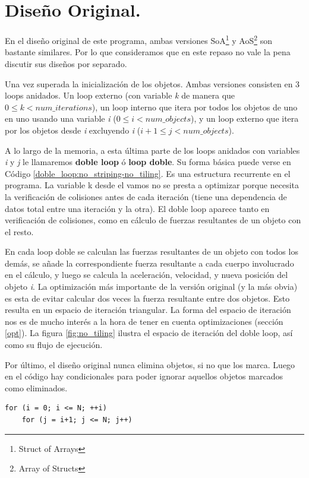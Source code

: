 \documentclass{article}
\begin{document}
\section{Diseño Original.\label{original}}
En el diseño original de este programa, ambas versiones SoA\footnote{Struct of Arrays} y AoS\footnote{Array of Structs}
son bastante similares. Por lo que consideramos que en este repaso no vale la pena discutir sus diseños por separado.


Una vez superada la inicialización de los objetos. Ambas versiones consisten en 3 loops anidados.
Un loop externo (con variable \textit{k} de manera que $0\leq{k} < {num\_iterations}$),
un loop interno que itera por todos los objetos de uno en uno usando una variable \textit{i}
($0\leq{i} < {num\_objects}$), y un loop externo que itera por los objetos desde \textit{i}
excluyendo \textit{i} ($i+1\leq{j} < {num\_objects}$).

A lo largo de la memoria, a esta última
parte de los loops anidados con variables \textit{i} y \textit{j} le llamaremos \textbf{doble loop} ó \textbf{loop doble}.
Su forma básica puede verse en Código \ref{doble_loop:no_striping-no_tiling}.
Es una estructura recurrente en el programa. La variable k desde el vamos no se presta a optimizar porque
necesita la verificación de colisiones antes de cada iteración (tiene una dependencia de datos total
entre una iteración y la otra). El doble loop aparece tanto en verificación de colisiones, como en cálculo de
fuerzas resultantes de un objeto con el resto.


En cada loop doble se calculan las fuerzas resultantes de un objeto con todos los demás, se añade la
correspondiente fuerza resultante a cada cuerpo involucrado en el cálculo, y luego se calcula la
aceleración, velocidad, y nueva posición del objeto \textit{i}. La optimización más importante de la
versión original (y la más obvia) es esta de evitar calcular dos veces la fuerza resultante entre
dos objetos. Esto resulta en un espacio de iteración triangular. La forma del espacio de iteración nos es de mucho interés
a la hora de tener en cuenta optimizaciones (sección \ref{opt}). La figura \ref{fig:no_tiling} ilustra
el espacio de iteración del doble loop, así como su flujo de ejecución.


Por último, el diseño original nunca elimina objetos, si no que
los marca. Luego en el código hay condicionales para poder
ignorar aquellos objetos marcados como eliminados.

\begin{lstlisting}[style=CStyle,label=doble_loop:no_striping-no_tiling,caption=doble loop simple.]
for (i = 0; i <= N; ++i)
	for (j = i+1; j <= N; j++)
\end{lstlisting}
\end{document}
